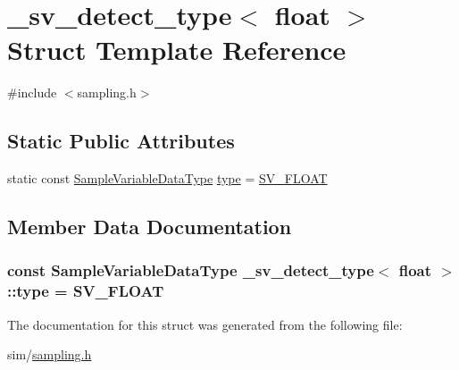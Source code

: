 \hypertarget{struct__sv__detect__type_3_01float_01_4}{\section{\+\_\+sv\+\_\+detect\+\_\+type$<$ float $>$ Struct Template Reference}
\label{struct__sv__detect__type_3_01float_01_4}
}


{\ttfamily \#include $<$sampling.\+h$>$}

\subsection*{Static Public Attributes}
\begin{DoxyCompactItemize}
\item 
static const \hyperlink{sampling_8h_aebe1c9f7e0bdb2dfac88bf77cf6c695e}{Sample\+Variable\+Data\+Type} \hyperlink{struct__sv__detect__type_3_01float_01_4_a77598a51421ce95fb85970d1adf57208}{type} = \hyperlink{sampling_8h_aebe1c9f7e0bdb2dfac88bf77cf6c695eaf1631c0808b6554059af5ff3ccdaca15}{S\+V\+\_\+\+F\+L\+O\+A\+T}
\end{DoxyCompactItemize}


\subsection{Member Data Documentation}
\hypertarget{struct__sv__detect__type_3_01float_01_4_a77598a51421ce95fb85970d1adf57208}{
\subsubsection[{type}]{\setlength{\rightskip}{0pt plus 5cm}const {\bf Sample\+Variable\+Data\+Type} {\bf \+\_\+sv\+\_\+detect\+\_\+type}$<$ float $>$\+::type = {\bf S\+V\+\_\+\+F\+L\+O\+A\+T}\hspace{0.3cm}{\ttfamily [static]}}}\label{struct__sv__detect__type_3_01float_01_4_a77598a51421ce95fb85970d1adf57208}


The documentation for this struct was generated from the following file\+:\begin{DoxyCompactItemize}
\item 
sim/\hyperlink{sampling_8h}{sampling.\+h}\end{DoxyCompactItemize}
